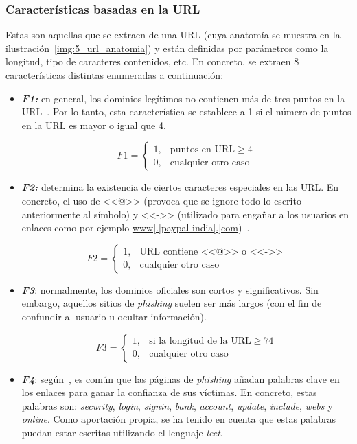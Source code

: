 \subsubsection{Características basadas en la URL}
Estas son aquellas que se extraen de una URL (cuya anatomía se muestra en la ilustración~\ref{img:5_url_anatomia}) y están definidas por parámetros como la longitud, tipo de caracteres contenidos, etc. En concreto, se extraen 8 características distintas enumeradas a continuación:

\begin{itemize}
	\item \textit{\textbf{F1:}} en general, los dominios legítimos no contienen más de tres puntos en la URL~\cite{featuresPhishing2018Gupta}. Por lo tanto, esta característica se establece a 1 si el número de puntos en la URL es mayor o igual que 4.
	
	\[F1 = \left\{ \begin{array}{lr} 1, & \text{puntos en URL} \ge 4\\ 
	0, & \text{cualquier otro caso} \label{eqn:phishing_f1} \end{array} \right. \] 
	
	\item \textit{\textbf{F2:}} determina la existencia de ciertos caracteres especiales en las URL. En concreto, el uso de <<@>> (provoca que se ignore todo lo escrito anteriormente al símbolo) y <<->> (utilizado para engañar a los usuarios en enlaces como por ejemplo \url{www[.]paypal-india[.]com})~\cite{featuresPhishing2018Gupta}.
	
	\[F2 = \left\{ \begin{array}{lr} 1, & \text{URL contiene <<@>> o <<->>}\\ 
	0, & \text{cualquier otro caso} \label{eqn:phishing_f2} \end{array} \right. \]
	
	\item \textit{\textbf{F3}}: normalmente, los dominios oficiales son cortos y significativos. Sin embargo, aquellos sitios de \textit{phishing} suelen ser más largos (con el fin de confundir al usuario u ocultar información).
	
	\[F3 = \left\{ \begin{array}{lr} 1, & \text{si la longitud de la URL} \ge 74\\ 
	0, & \text{cualquier otro caso} \label{eqn:phishing_f3} \end{array} \right. \]
	
	\item \textit{\textbf{F4}}: según~\cite{featuresPhishing2018Gupta}, es común que las páginas de \textit{phishing} añadan palabras clave en los enlaces para ganar la confianza de sus víctimas. En concreto, estas palabras son: \textit{security}, \textit{login}, \textit{signin}, \textit{bank}, \textit{account}, \textit{update}, \textit{include}, \textit{webs} y \textit{online}. Como aportación propia, se ha tenido en cuenta que estas palabras puedan estar escritas utilizando el lenguaje \textit{leet}.
	

\end{itemize}
